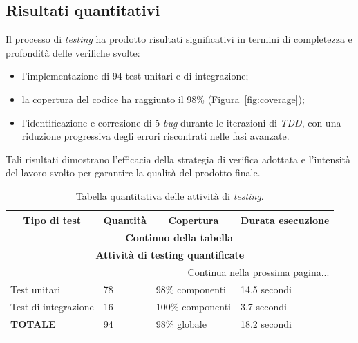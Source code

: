 \subsection{Risultati quantitativi}
Il processo di \textit{testing} ha prodotto risultati significativi in termini di completezza e profondità delle verifiche svolte:
\begin{itemize}
    \item l'implementazione di 94 test unitari e di integrazione;
    \item la copertura del codice ha raggiunto il 98\% (Figura~\ref{fig:coverage});
    \item l'identificazione e correzione di 5 \textit{bug} durante le iterazioni di \textit{TDD}, con una riduzione progressiva degli errori riscontrati nelle fasi avanzate.
\end{itemize}
Tali risultati dimostrano l'efficacia della strategia di verifica adottata e l'intensità del lavoro svolto per garantire la qualità del prodotto finale.  

\begin{center}
\begin{longtable}{|p{}|p{}|p{}|p{}|}
\hline
\multicolumn{1}{|c|}{\textbf{Tipo di test}} & 
\multicolumn{1}{c|}{\textbf{Quantità}} & 
\multicolumn{1}{c|}{\textbf{Copertura}} & 
\multicolumn{1}{c|}{\textbf{Durata esecuzione}} \\ 
\hline
\endfirsthead

\multicolumn{4}{c}{{\bfseries \tablename\ \thetable{} -- Continuo della tabella}}\\
\hline
\multicolumn{4}{|c|}{\textbf{Attività di testing quantificate}} \\ \hline
\endhead

\hline \multicolumn{4}{|r|}{{Continua nella prossima pagina...}} \\ \hline
\endfoot

\endlastfoot

Test unitari & 78 & 98\% componenti & 14.5 secondi \\ \hline
Test di integrazione & 16 & 100\% componenti & 3.7 secondi \\ \hline
\textbf{TOTALE} & 94 & 98\% globale & 18.2 secondi \\ \hline

\caption{Tabella quantitativa delle attività di \textit{testing}.}
\label{tab:attivita-testing}
\end{longtable}
\end{center}


